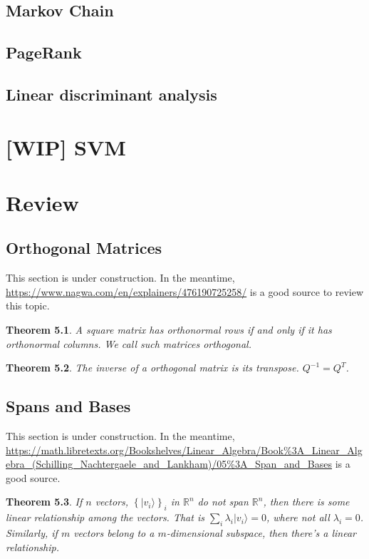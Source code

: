 \documentclass{amsbook}
\newtheorem{theorem}{Theorem}
\begin{document}
\section{Markov Chain}
\section{PageRank}
\section{Linear discriminant analysis}

\chapter{[WIP] SVM}

\chapter{Review}

\section{Orthogonal Matrices}\label{OrthogonalMatrices}

This section is under construction.  In the meantime, \url{https://www.nagwa.com/en/explainers/476190725258/} is a good source to review this topic.

\begin{theorem}\label{OrthogonalMatrixDefinition}
A square matrix has orthonormal rows if and only if it has orthonormal columns.  We call such matrices {\em orthogonal}.
\end{theorem}

\begin{theorem}\label{OrthogonalMatrixInverse}
The inverse of a orthogonal matrix is its transpose.  $Q^{-1}=Q^T$.
\end{theorem}

\section{Spans and Bases}\label{Spans and Bases}

This section is under construction.  In the meantime, \url{https://math.libretexts.org/Bookshelves/Linear_Algebra/Book%3A_Linear_Algebra_(Schilling_Nachtergaele_and_Lankham)/05%3A_Span_and_Bases} is a good source.

\begin{theorem}\label{LinearRelationship}
If $n$ vectors, $\left\{|v_i\rangle\right\}_i$ in $\mathbb R^n$ do not span $\mathbb R^n$, then there is some linear relationship among the vectors.  That is $\sum_i\lambda_i|v_i\rangle=0$, where not all $\lambda_i=0$.  Similarly, if $m$ vectors belong to a $m$-dimensional subspace, then there's a linear relationship.
\end{theorem}
\end{document}

